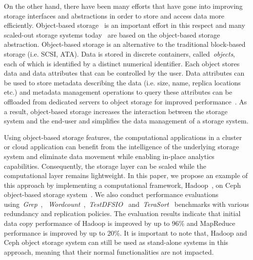 \documentclass[preprint,12pt]{elsarticle}
\begin{document}
On the other hand, there have been many efforts that have gone into
improving storage interfaces and abstractions in order to store
and access data more efficiently. Object-based
storage~\cite{Gibson:1998:CHS:291006.291029, 1222722} is
an important effort in this respect and many scaled-out storage
systems today~\cite{lustre_web,maltzahn2010ceph,openstack_swift}
are based on the object-based storage abstraction.
Object-based storage is an alternative to the traditional block-based
storage (i.e. SCSI, ATA). Data is stored in discrete
containers, called~\textit{objects}, each of which is identified
by a distinct numerical identifier. Each object stores data and data
attributes that can be controlled by the user. Data attributes can be used
to store metadata describing the data (i.e. size, name, replica
locations etc.) and metadata management operations to query these
attributes can be offloaded from dedicated servers to object storage
for improved performance~\cite{revisitmd}. As a result, object-based
storage increases the interaction between the storage system and
the end-user and simplifies the data management of a storage
system.

Using object-based storage features, the computational applications
in a cluster or cloud application can benefit from the intelligence
of the underlying storage system and eliminate data movement while
enabling in-place analytics capabilities. Consequently, the storage
layer can be scaled while the computational layer remains
lightweight. In this paper, we propose
an example of this approach by implementing a computational
framework, Hadoop~\cite{apache_hadoop}, on Ceph object-based
storage system~\cite{cephorig}. We also conduct performance
evaluations using~\textit{Grep}~\cite{hadoopgrep},
~\textit{Wordcount}~\cite{hadoopwordcount},~\textit{TestDFSIO}~\cite{hadooptestdfsio}
and~\textit{TeraSort}~\cite{hadoopterasort} benchmarks
with various redundancy and
replication policies. The evaluation results indicate that initial
data copy performance of Hadoop is improved by up to 96\% and
MapReduce performance is improved by up to 20\%. It is important
to note that, Hadoop and Ceph object storage system can still be
used as stand-alone systems in this approach, meaning that their
normal functionalities are not impacted.
\end{document}
